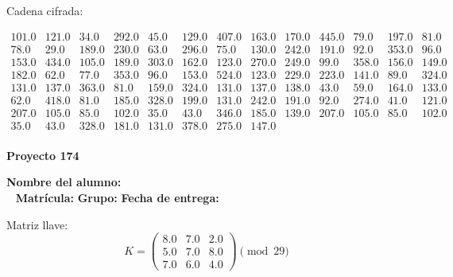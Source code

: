 \documentclass[12pt]{article}
\begin{document}
Cadena cifrada:
\begin{center}
$\begin{array}{lllllllllllll}
101.0 & 121.0 & 34.0 & 292.0 & 45.0 & 129.0 & 407.0 & 163.0 & 170.0 & 445.0 & 79.0 & 197.0 & 81.0\\
78.0 & 29.0 & 189.0 & 230.0 & 63.0 & 296.0 & 75.0 & 130.0 & 242.0 & 191.0 & 92.0 & 353.0 & 96.0\\
153.0 & 434.0 & 105.0 & 189.0 & 303.0 & 162.0 & 123.0 & 270.0 & 249.0 & 99.0 & 358.0 & 156.0 & 149.0\\
182.0 & 62.0 & 77.0 & 353.0 & 96.0 & 153.0 & 524.0 & 123.0 & 229.0 & 223.0 & 141.0 & 89.0 & 324.0\\
131.0 & 137.0 & 363.0 & 81.0 & 159.0 & 324.0 & 131.0 & 137.0 & 138.0 & 43.0 & 59.0 & 164.0 & 133.0\\
62.0 & 418.0 & 81.0 & 185.0 & 328.0 & 199.0 & 131.0 & 242.0 & 191.0 & 92.0 & 274.0 & 41.0 & 121.0\\
207.0 & 105.0 & 85.0 & 102.0 & 35.0 & 43.0 & 346.0 & 185.0 & 139.0 & 207.0 & 105.0 & 85.0 & 102.0\\
35.0 & 43.0 & 328.0 & 181.0 & 131.0 & 378.0 & 275.0 & 147.0\\
\end{array}$
\end{center}

\newpage


\textbf{Proyecto 174}

\textbf{Nombre del alumno:} \underline{\hspace{13cm}}\\\
\vspace{1cm}
\textbf{Matrícula:} \underline{\hspace{4cm}} \hspace{1cm}
\textbf{Grupo:} \underline{\hspace{2cm}}
\textbf{Fecha de entrega:} \underline{\hspace{2cm}}

\medskip

Matriz llave:
\[
K = \begin{pmatrix}
8.0 & 7.0 & 2.0\\
5.0 & 7.0 & 8.0\\
7.0 & 6.0 & 4.0
\end{pmatrix} \pmod{29}
\]
\end{document}
